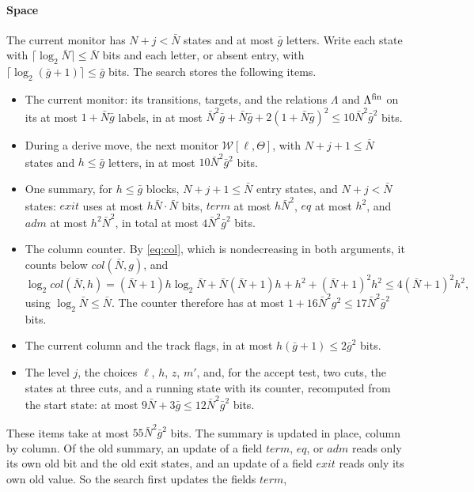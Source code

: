 \paragraph{Space}
The current monitor has $N+j<\bar N$ states and at most $\bar g$ letters.
Write each state with $\lceil\log_2\bar N\rceil\le\bar N$ bits and each
letter, or absent entry, with $\lceil\log_2(\bar g+1)\rceil\le\bar g$ bits.
The search stores the following items.
\begin{itemize}[leftmargin=*]
\item The current monitor: its transitions, targets, and the relations
  $\Lambda$ and $\Lambda^{\mathrm{fin}}$ on its at most $1+\bar N\bar g$ labels, in at most
  $\bar N^2\bar g+\bar N\bar g+2(1+\bar N\bar g)^2\le10\bar N^2\bar g^2$ bits.
\item During a derive move, the next monitor $\mathcal W[\ell,\Theta]$, with
  $N+j+1\le\bar N$ states and $h\le\bar g$ letters, in at most
  $10\bar N^2\bar g^2$ bits.
\item One summary, for $h\le\bar g$ blocks, $N+j+1\le\bar N$ entry states, and
  $N+j<\bar N$ states: $\mathit{exit}$ uses at most $h\bar N\cdot\bar N$ bits,
  $\mathit{term}$ at most $h\bar N^2$, $\mathit{eq}$ at most $h^2$, and
  $\mathit{adm}$ at most $h^2\bar N^2$, in total at most $4\bar N^2\bar g^2$
  bits.
\item The column counter. By \eqref{eq:col}, which is nondecreasing in both
  arguments, it counts below $\mathit{col}(\bar N,g)$, and
  \[
   \log_2\mathit{col}(\bar N,h)=(\bar N+1)h\log_2\bar N+\bar N(\bar N+1)h+h^2
   +(\bar N+1)^2h^2\le4(\bar N+1)^2h^2,
  \]
  using $\log_2\bar N\le\bar N$. The counter therefore has at most
  $1+16\bar N^2g^2\le17\bar N^2\bar g^2$ bits.
\item The current column and the track flags, in at most
  $h(\bar g+1)\le2\bar g^2$ bits.
\item The level $j$, the choices $\ell$, $h$, $z$, $m'$, and, for the accept
  test, two cuts, the states at three cuts, and a running state with its
  counter, recomputed from the start state: at most
  $9\bar N+3\bar g\le12\bar N^2\bar g^2$ bits.
\end{itemize}
These items take at most $55\bar N^2\bar g^2$ bits. The summary is updated
in place, column by column. Of the old summary, an update of a field
$\mathit{term}$, $\mathit{eq}$, or $\mathit{adm}$ reads only its own old bit
and the old exit states, and an update of a field $\mathit{exit}$ reads only
its own old value. So the search first updates the fields $\mathit{term}$,
